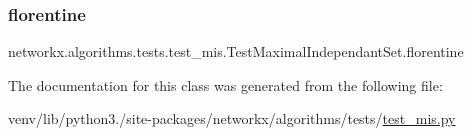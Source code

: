 \subsubsection{\texorpdfstring{florentine}{florentine}}
{\footnotesize\ttfamily networkx.\+algorithms.\+tests.\+test\+\_\+mis.\+Test\+Maximal\+Independant\+Set.\+florentine}



The documentation for this class was generated from the following file\+:\begin{DoxyCompactItemize}
\item 
venv/lib/python3./site-\/packages/networkx/algorithms/tests/\hyperlink{test__mis_8py}{test\+\_\+mis.\+py}\end{DoxyCompactItemize}
